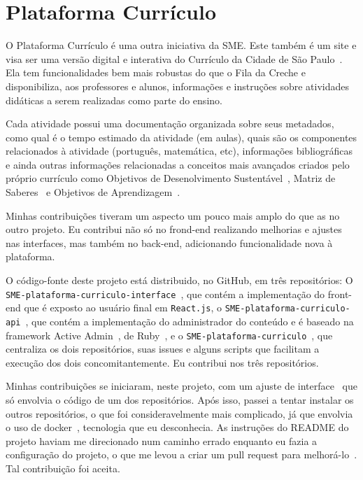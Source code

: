\documentclass[a4paper, 11pt]{article} %
\begin{document}

\section*{Plataforma Currículo}

O Plataforma Currículo é uma outra iniciativa da SME. Este também é um site e visa ser uma versão digital e interativa do Currículo da Cidade de São Paulo~\cite{Curriculo}. Ela tem funcionalidades bem mais robustas do que o Fila da Creche e disponibiliza, aos professores e alunos, informações e instruções sobre atividades didáticas a serem realizadas como parte do ensino.  

Cada atividade possui uma documentação organizada sobre seus metadados, como qual é o tempo estimado da atividade (em aulas), quais são os componentes relacionados à atividade (português, matemática, etc), informações bibliográficas e ainda outras informações relacionadas a conceitos mais avançados criados pelo próprio currículo como Objetivos de Desenolvimento Sustentável~\cite{ODS}, Matriz de Saberes~\cite{Matriz} e Objetivos de Aprendizagem~\cite{Objetivos}.

Minhas contribuições tiveram um aspecto um pouco mais amplo do que as no outro projeto. Eu contribui não só no frond-end realizando melhorias e ajustes nas interfaces, mas também no back-end, adicionando funcionalidade nova à plataforma.

O código-fonte deste projeto está distribuido, no GitHub, em três repositórios: O \texttt{SME-plataforma-curriculo-interface}~\cite{PCInterface}, que contém a implementação do front-end que é exposto ao usuário final em \texttt{React.js}, o \texttt{SME-plataforma-curriculo-api}~\cite{PCAPI}, que contém a implementação do administrador do conteúdo e é baseado na framework Active Admin~\cite{ActiveAdmin}, de Ruby~\cite{Ruby}, e o \texttt{SME-plataforma-curriculo}~\cite{PC}, que centraliza os dois repositórios, suas issues e alguns scripts que facilitam a execução dos dois concomitantemente. Eu contribui nos três repositórios.

Minhas contribuições se iniciaram, neste projeto, com um ajuste de interface~\cite{PCI_P69} que só envolvia o código de um dos repositórios. Após isso, passei a tentar instalar os outros repositórios, o que foi consideravelmente mais complicado, já que envolvia o uso de docker~\cite{Docker}, tecnologia que eu desconhecia. As instruções do README do projeto haviam me direcionado num caminho errado enquanto eu fazia a configuração do projeto, o que me levou a criar um pull request para melhorá-lo~\cite{PC_P26}. Tal contribuição foi aceita.
\end{document}
